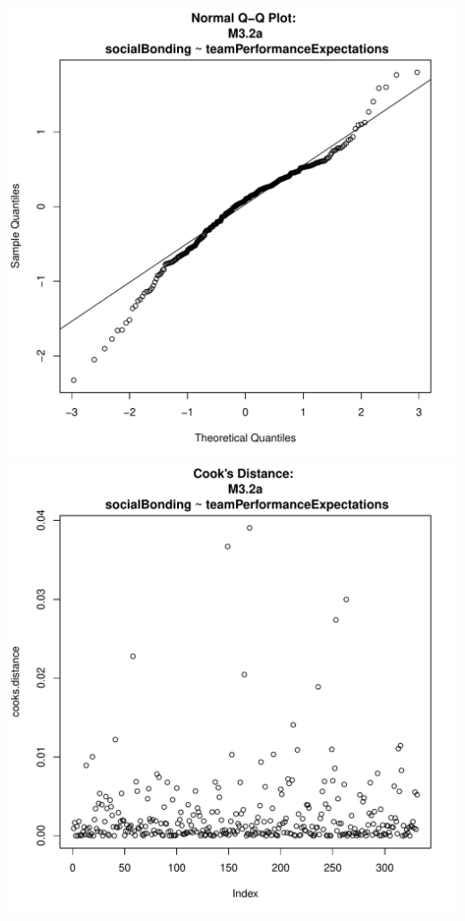 \documentclass[12pt]{report}
\begin{document}
\includegraphics[scale =.4]{../images/MLM32aQQNorm.pdf}
\includegraphics[scale =.4]{../images/MLM32aCooksD.pdf}
\end{document}
